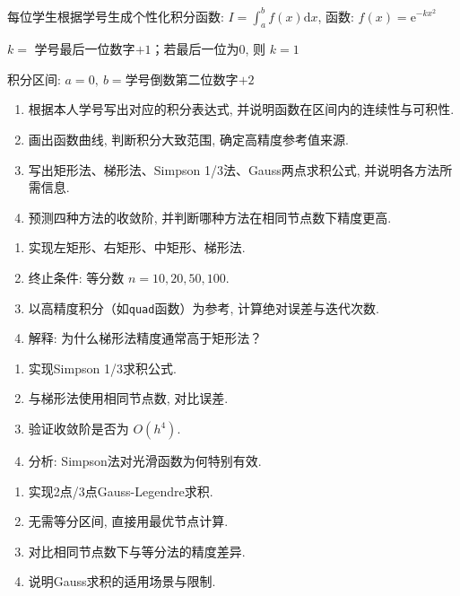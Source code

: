 \documentclass[zihao=-4,a4paper]{ctexart}
\begin{document}
\noindent 每位学生根据学号生成个性化积分函数: $I=\int_{a}^{b}f(x)\mathrm{d}x$, 函数: $f(x)=\mathrm{e}^{-kx^2}$

\noindent $k = $ 学号最后一位数字$+1$；若最后一位为$0$, 则 $k=1$

\noindent 积分区间: $a=0,\ b=$学号倒数第二位数字$+2$

\begin{enumerate}
    \item 根据本人学号写出对应的积分表达式, 并说明函数在区间内的连续性与可积性. 
    \item 画出函数曲线, 判断积分大致范围, 确定高精度参考值来源. 
    \item 写出矩形法、梯形法、Simpson 1/3法、Gauss两点求积公式, 并说明各方法所需信息. 
    \item 预测四种方法的收敛阶, 并判断哪种方法在相同节点数下精度更高. 
\end{enumerate}


\begin{enumerate}
    \item 实现左矩形、右矩形、中矩形、梯形法. 
    \item 终止条件: 等分数 $n=10,20,50,100$. 
    \item 以高精度积分（如\texttt{quad}函数）为参考, 计算绝对误差与迭代次数. 
    \item 解释: 为什么梯形法精度通常高于矩形法？
\end{enumerate}


\begin{enumerate}
    \item 实现Simpson 1/3求积公式. 
    \item 与梯形法使用相同节点数, 对比误差. 
    \item 验证收敛阶是否为 $O(h^4)$. 
    \item 分析: Simpson法对光滑函数为何特别有效. 
\end{enumerate}

\begin{enumerate}
    \item 实现2点/3点Gauss-Legendre求积. 
    \item 无需等分区间, 直接用最优节点计算. 
    \item 对比相同节点数下与等分法的精度差异. 
    \item 说明Gauss求积的适用场景与限制. 
\end{enumerate}
\end{document}
